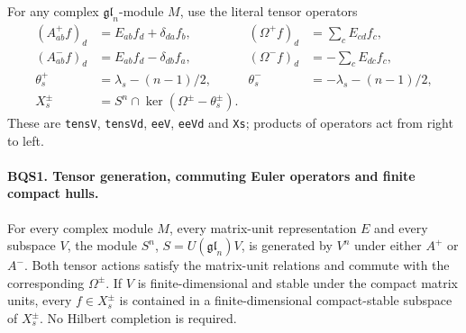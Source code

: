 For any complex $\mathfrak{gl}_n$-module $M$, use the literal tensor
operators
\[
\begin{aligned}
 (A^+_{ab}f)_d&=E_{ab}f_d+\delta_{da}f_b,&
 (\Omega^+f)_d&=\sum_cE_{cd}f_c,\\
 (A^-_{ab}f)_d&=E_{ab}f_d-\delta_{db}f_a,&
 (\Omega^-f)_d&=-\sum_cE_{dc}f_c,\\
 \theta_s^+&=\lambda_s-(n-1)/2,&
 \theta_s^-&=-\lambda_s-(n-1)/2,\\
 X_s^\pm&=S^n\cap\ker(\Omega^\pm-\theta_s^\pm).
\end{aligned}
\tag{BQS.4}
\]
These are \texttt{tensV}, \texttt{tensVd}, \texttt{eeV},
\texttt{eeVd} and \texttt{Xs}; products of operators act from right to
left.

\paragraph{BQS1. Tensor generation, commuting Euler operators and finite compact hulls.}
\label{claim:BQS1}
For every complex module $M$, every matrix-unit representation $E$ and
every subspace $V$, the module $S^n$, $S=U(\mathfrak{gl}_n)V$, is generated
by $V^n$ under either $A^+$ or $A^-$.  Both tensor actions satisfy the
matrix-unit relations and commute with the corresponding $\Omega^\pm$.
If $V$ is finite-dimensional and stable under the compact matrix units,
every $f\in X_s^\pm$ is contained in a finite-dimensional compact-stable
subspace of $X_s^\pm$.  No Hilbert completion is required.

